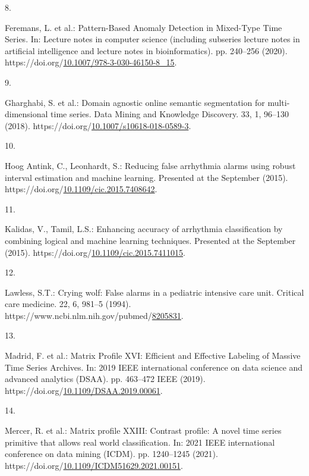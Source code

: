 \documentclass[runningheads]{llncs}
\newlength{\cslhangindent}
\newlength{\csllabelwidth}
\newenvironment{CSLReferences}[2] %
 {%
  \setlength{\parindent}{0pt}
  \ifodd #1 \everypar{\setlength{\hangindent}{\cslhangindent}}\ignorespaces\fi
  \ifnum #2 > 0
  \setlength{\parskip}{#2\baselineskip}
  \fi
 }%
 {}
\newcommand{\CSLLeftMargin}[1]{\parbox[t]{\csllabelwidth}{#1}}
\newcommand{\CSLRightInline}[1]{\parbox[t]{\linewidth - \csllabelwidth}{#1}\break}
\begin{document}
\begin{CSLReferences}{0}{0}
\leavevmode{}%
\CSLLeftMargin{8. }
\CSLRightInline{Feremans, L. et al.: {Pattern-Based Anomaly Detection in Mixed-Type Time Series}. In: Lecture notes in computer science (including subseries lecture notes in artificial intelligence and lecture notes in bioinformatics). pp. 240--256 (2020). https://doi.org/\href{https://doi.org/10.1007/978-3-030-46150-8_15}{10.1007/978-3-030-46150-8\_15}.}

\leavevmode{}%
\CSLLeftMargin{9. }
\CSLRightInline{Gharghabi, S. et al.: Domain agnostic online semantic segmentation for multi-dimensional time series. Data Mining and Knowledge Discovery. 33, 1, 96--130 (2018). https://doi.org/\href{https://doi.org/10.1007/s10618-018-0589-3}{10.1007/s10618-018-0589-3}.}

\leavevmode{}%
\CSLLeftMargin{10. }
\CSLRightInline{Hoog Antink, C., Leonhardt, S.: Reducing false arrhythmia alarms using robust interval estimation and machine learning. Presented at the September (2015). https://doi.org/\href{https://doi.org/10.1109/cic.2015.7408642}{10.1109/cic.2015.7408642}.}

\leavevmode{}%
\CSLLeftMargin{11. }
\CSLRightInline{Kalidas, V., Tamil, L.S.: Enhancing accuracy of arrhythmia classification by combining logical and machine learning techniques. Presented at the September (2015). https://doi.org/\href{https://doi.org/10.1109/cic.2015.7411015}{10.1109/cic.2015.7411015}.}

\leavevmode{}%
\CSLLeftMargin{12. }
\CSLRightInline{Lawless, S.T.: Crying wolf: False alarms in a pediatric intensive care unit. Critical care medicine. 22, 6, 981--5 (1994). https://www.ncbi.nlm.nih.gov/pubmed/\href{https://www.ncbi.nlm.nih.gov/pubmed/8205831}{8205831}.}

\leavevmode{}%
\CSLLeftMargin{13. }
\CSLRightInline{Madrid, F. et al.: {Matrix Profile XVI: Efficient and Effective Labeling of Massive Time Series Archives}. In: 2019 IEEE international conference on data science and advanced analytics (DSAA). pp. 463--472 IEEE (2019). https://doi.org/\href{https://doi.org/10.1109/DSAA.2019.00061}{10.1109/DSAA.2019.00061}.}

\leavevmode{}%
\CSLLeftMargin{14. }
\CSLRightInline{Mercer, R. et al.: Matrix profile XXIII: Contrast profile: A novel time series primitive that allows real world classification. In: 2021 IEEE international conference on data mining (ICDM). pp. 1240--1245 (2021). https://doi.org/\href{https://doi.org/10.1109/ICDM51629.2021.00151}{10.1109/ICDM51629.2021.00151}.}


\end{CSLReferences}
\end{document}
